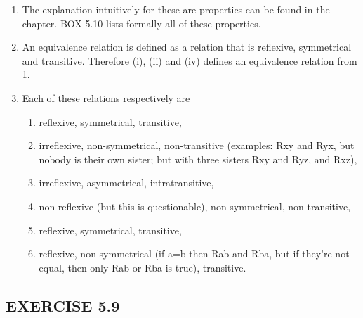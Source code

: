 \documentclass[a4paper,12pt]{article}
\begin{document}
    \begin{enumerate}[label=\arabic*,leftmargin=*]
        \item The explanation intuitively for these are properties can be found in the chapter. BOX 5.10 lists formally all of these properties.
        \item An equivalence relation is defined as a relation that is reflexive, symmetrical and transitive. Therefore (i), (ii) and (iv) defines an equivalence relation from 1.
        \item Each of these relations respectively are
            \begin{enumerate}[label=(\roman*)]
                \item reflexive, symmetrical, transitive,
                \item irreflexive, non-symmetrical, non-transitive (examples: Rxy and Ryx, but nobody is their own sister; but with three sisters Rxy and Ryz, and Rxz),
                \item irreflexive, asymmetrical, intratransitive,
                \item non-reflexive (but this is questionable), non-symmetrical, non-transitive,
                \item reflexive, symmetrical, transitive,
                \item reflexive, non-symmetrical (if a=b then Rab and Rba, but if they're not equal, then only Rab or Rba is true), transitive.
            \end{enumerate}
    \end{enumerate}

    \subsection*{EXERCISE 5.9}
\end{document}
